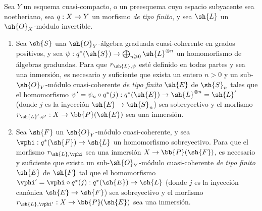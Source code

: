 \documentclass[oneside,10pt]{amsart}
\makeatletter
\renewcommand{\geq}{\geqslant}
\newcommand{\ega@arrow}[2]{\mathchoice{#1}{#2}{#2}{#2}}
\renewcommand{\to}{\ega@arrow{\longrightarrow}{\rightarrow}}
\newcommand{\oldpage}[2][]{\marginnote{\normalfont\footnotesize\textbf{#1}~|~#2}\ignorespaces}
\let\EGAOriginalLabel\label
\renewcommand{\label}[1]{\phantomsection\EGAOriginalLabel{#1}}
\makeatother
\begin{document}
\begin{proposition}[4.4.1]
\label{II.4.4.1}
Sea $Y$ un esquema cuasi-compacto, o un preesquema cuyo espacio subyacente sea noetheriano, sea $q:X\to Y$ un morfismo \emph{de tipo finito}, y sea $\sh{L}$ un $\sh{O}_X$-módulo invertible.
\begin{enumerate}
  \item[\rm{(i)}] Sea $\sh{S}$ una $\sh{O}_Y$-álgebra graduada cuasi-coherente en grados positivos, y sea $\psi:q^*(\sh{S})\to\bigoplus_{n\geq0}\sh{L}^{\otimes n}$ un homomorfismo de álgebras graduadas.
    Para que $r_{\sh{L},\psi}$ esté definido en todas partes y sea una inmersión, es necesario y
\oldpage[II]{79}
    suficiente que exista un entero $n>0$ y un sub-$\sh{O}_Y$-módulo cuasi-coherente \emph{de tipo finito} $\sh{E}$ de $\sh{S}_n$ tales que el homomorfismo $\psi'=\psi_n\circ q^*(j):q^*(\sh{E})\to\sh{L}^{\otimes n}=\sh{L}'$ (donde $j$ es la inyección $\sh{E}\to\sh{S}_n$) sea sobreyectivo y el morfismo $r_{\sh{L}',\psi'}:X\to\bb{P}(\sh{E})$ sea una inmersión.
  \item[\rm{(ii)}] Sea $\sh{F}$ un $\sh{O}_Y$-módulo cuasi-coherente, y sea $\vphi:q^*(\sh{F})\to\sh{L}$ un homomorfismo sobreyectivo.
    Para que el morfismo $r_{\sh{L},\vphi}$ sea una inmersión $X\to\bb{P}(\sh{F})$, es necesario y suficiente que exista un sub-$\sh{O}_Y$-módulo cuasi-coherente \emph{de tipo finito} $\sh{E}$ de $\sh{F}$ tal que el homomorfismo $\vphi'=\vphi\circ q^*(j):q^*(\sh{E})\to\sh{L}$ (donde $j$ es la inyección canónica $\sh{E}\to\sh{F}$) sea sobreyectivo y el morfismo $r_{\sh{L},\vphi'}:X\to\bb{P}(\sh{E})$ sea una inmersión.
\end{enumerate}
\end{proposition}
\end{document}
